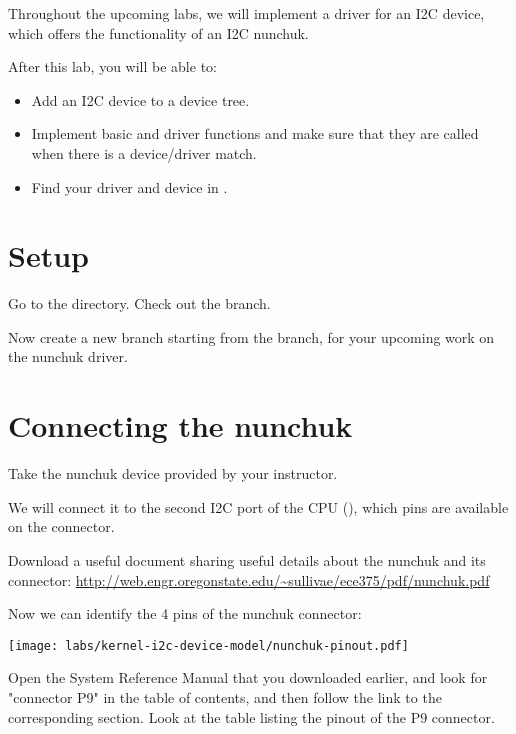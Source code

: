 
Throughout the upcoming labs, we will implement a driver for an I2C
device, which offers the functionality of an I2C nunchuk.

After this lab, you will be able to:

\begin{itemize}
\item Add an I2C device to a device tree.
\item Implement basic  and  driver
functions and make sure that they are called when there is a
device/driver match.
\item Find your driver and device in .
\end{itemize}

\section{Setup}

Go to the  directory. Check out the
 branch. 

Now create a new  branch starting from the
 branch,  for your upcoming work on the nunchuk
driver.  

\section{Connecting the nunchuk}

Take the nunchuk device provided by your instructor.

We will connect it to the second I2C port of the CPU (),
which pins are available on the  connector.

Download a useful document sharing useful details about the nunchuk
and its connector: 
\url{http://web.engr.oregonstate.edu/~sullivae/ece375/pdf/nunchuk.pdf}

Now we can identify the 4 pins of the nunchuk connector:

\begin{center}
\texttt{[image: labs/kernel-i2c-device-model/nunchuk-pinout.pdf]}
\end{center}

Open the System Reference Manual that you downloaded earlier,
and look for "connector P9" in the table of contents, and then
follow the link to the corresponding section. Look at the table listing
the pinout of the P9 connector.


